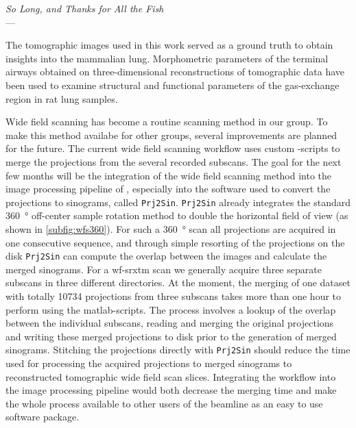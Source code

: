 \acresetall
{}\label{ch:outlook}
\begin{flushright}{\slshape
	So Long, and Thanks for All the Fish} \\ \medskip
	---  \citep{Adams1984}
\end{flushright}
\vspace{6cm}

The tomographic images used in this work served as a ground truth to obtain insights into the mammalian lung. Morphometric parameters of the terminal airways obtained on three-dimensional reconstructions of tomographic data have been used to examine structural and functional parameters of the gas-exchange region in rat lung samples.

Wide field scanning has become a routine scanning method in our group. To make this method availabe for other groups, several improvements are planned for the future. The current wide field scanning workflow uses custom -scripts to merge the projections from the several recorded subscans. The goal for the next few months will be the integration of the wide field scanning method into the image processing pipeline of , especially into the software used to convert the projections to sinograms, called \texttt{Prj2Sin}. \texttt{Prj2Sin} already integrates the standard \SI{360}{\degree} off-center sample rotation method to double the horizontal field of view (as shown in \autoref{subfig:wfs360}). For such a \SI{360}{\degree} scan all projections are acquired in one consecutive sequence, and through simple resorting of the projections on the disk \texttt{Prj2Sin} can compute the overlap between the images and calculate the merged sinograms. For a \ac{wf-srxtm} scan we generally acquire three separate subscans in three different directories. At the moment, the merging of one dataset with totally \num{10734} projections from three subscans takes more than one hour to perform using the \ac{matlab}-scripts. The process involves a lookup of the overlap between the individual subscans, reading and merging the original projections and writing these merged projections to disk prior to the generation of merged sinograms. Stitching the projections directly with \texttt{Prj2Sin} should reduce the time used for processing the acquired projections to merged sinograms to reconstructed tomographic wide field scan slices. Integrating the workflow into the image processing pipeline would both decrease the merging time and make the whole process available to other users of the beamline as an easy to use software package.

